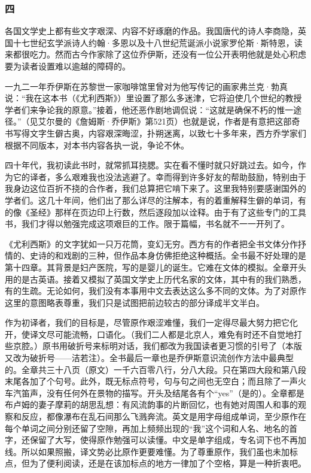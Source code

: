 \subsubsection*{四}
\par 各国文学史上都有些文字艰深、内容不好琢磨的作品。我国唐代的诗人李商隐，英国十七世纪玄学派诗人约翰·多恩以及十八世纪荒诞派小说家罗伦斯·斯特恩，读来都很吃力。然而古今作家除了这位乔伊斯，还没有一位公开表明他就是处心积虑要为读者设置难以逾越的障碍的。
\par 一九二一年乔伊斯在苏黎世一家咖啡馆里曾对为他写传记的画家弗兰克·勃真说：“我在这本书（《尤利西斯》）里设置了那么多迷津，它将迫使几个世纪的教授学者们来争论我的原意。”接着，他还恶作剧地调侃说：“这就是确保不朽的惟一途径。”（见艾尔曼的《詹姆斯·乔伊斯》第521页）也就是说，作者是有意把这部奇书写得文字生僻古奥，内容艰深晦涩，扑朔迷离，以致七十多年来，西方乔学家们根据不同版本，对本书内容各执一说，争论不休。
\par 四十年代，我初读此书时，就常抓耳挠腮。实在看不懂时就只好跳过去。如今，作为它的译者，多么艰难我也没法逃避了。幸而得到许多好友的帮助鼓励，特别由于我身边这位百折不挠的合作者，我们总算把它啃下来了。这里我特别要感谢国外的学者们。这几十年间，他们出了那么详尽的注解本，有的着重解释生僻的单词，有的像《圣经》那样在页边印上行数，然后逐段加以诠释。由于有了这些专门的工具书，我们才得以勉强完成这项艰巨的工作。限于篇幅，书名就不一一开列了。
\par 《尤利西斯》的文字犹如一只万花筒，变幻无穷。西方有的作者把全书文体分作抒情的、史诗的和戏剧的三种，但作品本身仿佛拒绝这种概括。全书最不好处理的是第十四章。其背景是妇产医院，写的是婴儿的诞生。它难在文体的模拟。全章开头用的是古英语。接着又模拟了英国文学史上历代名家的文体，其中有的我们熟悉，有的生疏。无论如何，我们没有本事用中文去表达这么多不同的文体。为了对原作这里的意图略表尊重，我们只是试图把前边较古的部分译成半文半白。
\par 作为初译者，我们的目标是，尽管原作艰涩难懂，我们一定得尽最大努力把它化开，使译文尽可能流畅，口语化。（我们二人都是北京人，难免有时还不自觉地打些京腔。）原书用破折号来标明对话，我们都改为我国读者更习惯的引号了（本版又改为破折号——洁若注）。全书最后一章也是乔伊斯意识流创作方法中最典型的。全章共三十八页（原文）一千六百零八行，分八大段。只在第四大段和第八段末尾各加了个句号。此外，既无标点符号，句与句之间也无空白；而且除了一声火车汽笛声，没有任何外在景物的描写。开头及结尾各有个“yes”（是的）。全章都是布卢姆的妻子摩莉的胡思乱想：有风流韵事的片断回忆，也有她对周围人和事的观察和反应，都像瀑布在乱石间那么飞溅奔流。英文是用字母组成单词，至少原作在每个单词之间分别还留了空隙，再加上频频出现的“我”这个词和人名、地名的首字，还保留了大写，使得原作勉强可以读懂。中文是单字组成，专名词下也不再加线。所以如果照搬，译文势必比原作更要难懂。为了尊重原作，我们虽也未加标点，但为了便利阅读，还是在该加标点的地方一律加了个空格，算是一种折衷吧。
